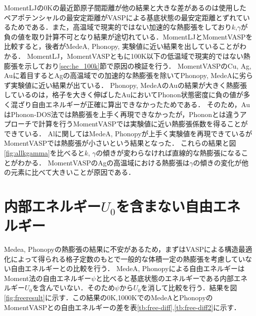 MomentLJの0Kの最近節原子間距離が他の結果と大きな差があるのは使用したペアポテンシャルの最安定距離がVASPによる基底状態の最安定距離とずれているためである．また，高温域で現実的ではない加速的な熱膨張をしており$k$,$\gamma$が負の値を取り計算不可となり結果が途切れている．MomentLJとMomentVASPを比較すると，後者がMedeA, Phonopy, 実験値に近い結果を出していることがわかる．
MomentLJ，MomentVASPともに100K以下の低温域で現実的ではない熱膨張を示しており\ref{sec:he_100k}節で原因の検証を行う．
MomentVASPのCu, Ag, Auに着目するとAgの高温域での加速的な熱膨張を除いてPhonopy, MedeAに劣らず実験値に近い結果が出ている．
Phonopy, MedeAのAuの結果が大きく熱膨張しているのは，格子を大きく伸ばしたAuにおいてPhonon状態密度に負の値が多く混ざり自由エネルギーが正確に算出できなかったためである．
そのため，AuはPhonon-DOS法では熱膨張を上手く再現できなかったが，Phononとは違うアプローチで計算を行うMomentVASPでは実験値に近い熱膨張係数を得ることができている．
Alに関してはMedeA, Phonopyが上手く実験値を再現できているがMomentVASPでは熱膨張が小さいという結果となった．
これらの結果と図\ref{fig:allkgamma}を比べると$k$, $\gamma$の傾きが変わらなければ直線的な熱膨張になることがわかる．
MomentVASPのAgの高温域における熱膨張は$\gamma$の傾きの変化が他の元素に比べて大きいことが原因である．


\section{内部エネルギー$U_0$を含まない自由エネルギー}
Medea, Phonopyの熱膨張の結果に不安があるため，まずはVASPによる構造最適化によって得られる格子定数のもとで一般的な体積一定の熱膨張を考慮していない自由エネルギーとの比較を行う．
MedeA, Phonopyによる自由エネルギーはMoment法の自由エネルギー$\psi$と比べると基底状態のエネルギーである内部エネルギー$U_0$を含んでいない．そのため$\psi$から$U_0$を消して比較を行う．結果を図\ref{fig:freeresult}に示す．この結果の0K,1000KでのMedeAとPhonopyのMomentVASPとの自由エネルギーの差を表\ref{tb:free-diff},\ref{tb:free-diff2}に示す．

